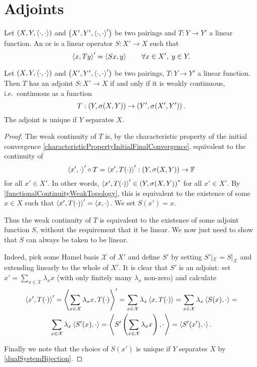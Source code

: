 \section{Adjoints}
\begin{definition}
Let $\left( X,Y,\left\langle \cdot,\cdot \right\rangle \right)$ and $\left( X',Y',\left\langle \cdot,\cdot \right\rangle' \right)$ be two pairings and $T: Y\to Y'$ a linear function. An  or  is a linear operator $S: X'\to X$ such that
\[ \left\langle x, Ty \right\rangle' = \left\langle Sx, y \right\rangle \qquad \forall x\in X', \; y\in Y. \]
\end{definition}

\begin{proposition}
Let $\left( X,Y,\left\langle \cdot,\cdot \right\rangle \right)$ and $\left( X',Y',\left\langle \cdot,\cdot \right\rangle' \right)$ be two pairings, $T: Y\to Y'$ a linear function. Then $T$ has an adjoint $S: X'\to X$ \textup{if and only if} it is weakly continuous, i.e.\ continuous as a function
\[ T: \left( Y, \sigma(X,Y) \right) \to \left( Y', \sigma(X',Y') \right). \]
The adjoint is unique if $Y$ separates $X$.
\end{proposition}
\begin{proof}
The weak continuity of $T$ is, by the characteristic property of the initial convergence \ref{characteristicPropertyInitialFinalConvergence}, equivalent to the continuity of
\[ \left\langle x', \cdot \right\rangle' \circ T = \left\langle x', T(\cdot) \right\rangle' : \left( Y, \sigma(X,Y) \right) \to \mathbb{F} \]
for all $x'\in X'$. In other words, $\left\langle x', T(\cdot) \right\rangle' \in {\left( Y, \sigma(X,Y) \right)}^*$ for all $x'\in X'$. By \ref{functionalContinuityWeakTopology}, this is equivalent to the existence of some $x\in X$ such that $\left\langle x', T(\cdot) \right\rangle' = \left\langle x,\cdot \right\rangle$. We set $S(x') = x$.

Thus the weak continuity of $T$ is equivalent to the existence of some adjoint function $S$, without the requirement that it be linear. We now just need to show that $S$ can always be taken to be linear.

Indeed, pick some Hamel basis $\mathcal{X}$ of $X'$ and define $S'$ by setting $S'|_{\mathcal{X}} = S|_{\mathcal{X}}$ and extending linearly to the whole of $X'$. It is clear that $S'$ is an adjoint: set $x' = \sum_{x\in\mathcal{X}}\lambda_x x$ (with only finitely many $\lambda_x$ non-zero) and calculate
\begin{multline*}
\left\langle x', T(\cdot) \right\rangle' = \left\langle \sum_{x\in\mathcal{X}}\lambda_x x, T(\cdot) \right\rangle' = \sum_{x\in\mathcal{X}}\lambda_x \left\langle x, T(\cdot) \right\rangle = \sum_{x\in\mathcal{X}}\lambda_x \left\langle S(x), \cdot \right\rangle = \\ \sum_{x\in\mathcal{X}}\lambda_x \left\langle S'(x), \cdot \right\rangle = \left\langle S'\left(\sum_{x\in\mathcal{X}}\lambda_x x\right), \cdot \right\rangle = \left\langle S'(x'), \cdot \right\rangle.
\end{multline*}

Finally we note that the choice of $S(x')$ is unique if $Y$ separates $X$ by \ref{dualSystemBijection}.
\end{proof}
